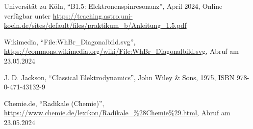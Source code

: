 \documentclass[12pt,a4paper]{scrartcl}
\numberwithin{equation}{section} %
\begin{document}
\begin{thebibliography}{99}
	Universität zu Köln, ``B1.5: Elektronenspinresonanz'', April 2024, Online verfügbar unter 
	\url{https://teaching.astro.uni-koeln.de/sites/default/files/praktikum_b/Anleitung_1.5.pdf}

	Wikimedia, ``File:WhBr\_Diagonalbild.svg'',
	\url{https://commons.wikimedia.org/wiki/File:WhBr_Diagonalbild.svg},
	Abruf am 23.05.2024

	J. D. Jackson, ``Classical Elektrodynamics'', John Wiley \& Sons,
	1975, ISBN 978-0-471-43132-9

	Chemie.de, ``Radikale (Chemie)'',
	\url{https://www.chemie.de/lexikon/Radikale_\%28Chemie\%29.html}, Abruf am 23.05.2024

\end{thebibliography}
\end{document}
